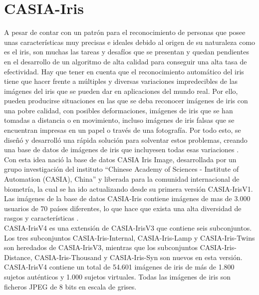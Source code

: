 
\section{CASIA-Iris}

A pesar de contar con un patrón para el reconocimiento de personas que posee unas características muy precisas e ideales debido al origen de su naturaleza como es el iris, son muchas las tareas y desafíos que se presentan y quedan pendientes en el desarrollo de un algoritmo de alta calidad para conseguir una alta tasa de efectividad. Hay que tener en cuenta que el reconocimiento automático del iris tiene que hacer frente a múltiples y diversas variaciones impredecibles de las imágenes del iris que se pueden dar en aplicaciones del mundo real. Por ello, pueden producirse situaciones en las que se deba reconocer imágenes de iris con una pobre calidad, con posibles deformaciones, imágenes de iris que se han tomadas a distancia o en movimiento, incluso imágenes de iris falsas que se encuentran impresas en un papel o través de una fotografía. Por todo esto, se diseñó y desarrolló una rápida solución para solventar estos problemas, creando una base de datos de imágenes de iris que incluyesen todas esas variaciones \cite{Reference20}. \\

Con esta idea nació la base de datos CASIA Iris Image, desarrollada por un grupo investigación del instituto “Chinese Academy of Sciences - Institute of Automation (CASIA), China” y liberada para la comunidad internacional de biometría, la cual se ha ido actualizando desde su primera versión CASIA-IrisV1. Las imágenes de la base de datos CASIA-Iris contiene imágenes de mas de 3.000 usuarios de 70 países diferentes, lo que hace que exista una alta diversidad de rasgos y características \cite{Reference20}. \\

CASIA-IrisV4 es una extensión de CASIA-IrisV3 que contiene seis subconjuntos. Los tres subconjuntos CASIA-Iris-Internal, CASIA-Iris-Lamp y CASIA-Iris-Twins son heredados de CASIA-IrisV3, mientras que los subconjuntos CASIA-Iris-Distance, CASIA-Iris-Thousand y CASIA-Iris-Syn son nuevos en esta versión. \\

CASIA-IrisV4 contiene un total de 54.601 imágenes de iris de más de 1.800 sujetos auténticos y 1.000 sujetos virtuales. Todas las imágenes de iris son ficheros JPEG de 8 bits en escala de grises. \\

